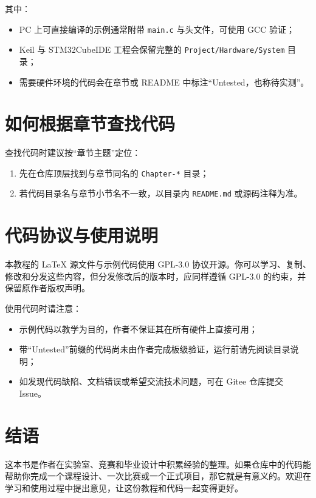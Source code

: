 其中：

\begin{itemize}
\item PC 上可直接编译的示例通常附带 \texttt{main.c} 与头文件，可使用 GCC 验证；
\item Keil 与 STM32CubeIDE 工程会保留完整的 \texttt{Project/Hardware/System} 目录；
\item 需要硬件环境的代码会在章节或 README 中标注“Untested，也称待实测”。
\end{itemize}

\section{如何根据章节查找代码}

查找代码时建议按“章节主题”定位：

\begin{enumerate}
\item 先在仓库顶层找到与章节同名的 \texttt{Chapter-*} 目录；
\item 若代码目录名与章节小节名不一致，以目录内 \texttt{README.md} 或源码注释为准。
\end{enumerate}

\section{代码协议与使用说明}

本教程的 \LaTeX{} 源文件与示例代码使用 GPL-3.0 协议开源。你可以学习、复制、修改和分发这些内容，但分发修改后的版本时，应同样遵循 GPL-3.0 的约束，并保留原作者版权声明。

使用代码时请注意：

\begin{itemize}
\item 示例代码以教学为目的，作者不保证其在所有硬件上直接可用；
\item 带“Untested”前缀的代码尚未由作者完成板级验证，运行前请先阅读目录说明；
\item 如发现代码缺陷、文档错误或希望交流技术问题，可在 Gitee 仓库提交 Issue。
\end{itemize}

\section{结语}

这本书是作者在实验室、竞赛和毕业设计中积累经验的整理。如果仓库中的代码能帮助你完成一个课程设计、一次比赛或一个正式项目，那它就是有意义的。欢迎在学习和使用过程中提出意见，让这份教程和代码一起变得更好。
